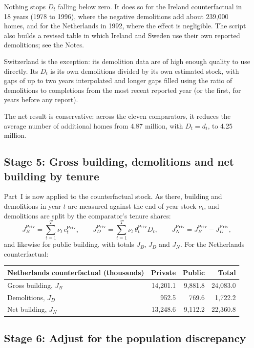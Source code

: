 \documentclass[11pt,a4paper]{article}
\newcommand{\priv}{\mathrm{Priv}}
\begin{document}
Nothing stops $D_t$ falling below zero. It does so for the Ireland counterfactual in 18
years (1978 to 1996), where the negative demolitions add about 239,000 homes, and for the
Netherlands in 1992, where the effect is negligible. The script also builds a revised table in
which Ireland and Sweden use their own reported demolitions; see the Notes.

Switzerland is the exception: its demolition data are of high enough quality to use
directly. Its $D_t$ is its own demolitions divided by its own estimated stock, with gaps of
up to two years interpolated and longer gaps filled using the ratio of demolitions to
completions from the most recent reported year (or the first, for years before any
report).

The net result is conservative: across the eleven comparators, it reduces the average
number of additional homes from 4.87 million, with $D_t = d_t$, to 4.25 million.

\subsection*{Stage 5: Gross building, demolitions and net building by tenure}

Part~I is now applied to the counterfactual stock. As there, building and demolitions in
year $t$ are measured against the end-of-year stock $\nu_t$, and demolitions are split by
the comparator's tenure shares:
\[
  J_B^{\priv} = \sum_{t=1}^{T} \nu_t\, c_t^{\priv}, \qquad
  J_D^{\priv} = \sum_{t=1}^{T} \nu_t\, \theta_t^{\priv} D_t, \qquad
  J_N^{\priv} = J_B^{\priv} - J_D^{\priv},
\]
and likewise for public building, with totals $J_B$, $J_D$ and $J_N$. For the
Netherlands counterfactual:

\begin{center}
\begin{tabular}{lrrr}
  \toprule
  Netherlands counterfactual (thousands) & Private & Public & Total\\
  \midrule
  Gross building, $J_B$  & 14,201.1 & 9,881.8 & 24,083.0\\
  Demolitions, $J_D$     &    952.5 &   769.6 &  1,722.2\\
  Net building, $J_N$    & 13,248.6 & 9,112.2 & 22,360.8\\
  \bottomrule
\end{tabular}
\end{center}

\subsection*{Stage 6: Adjust for the population discrepancy}
\end{document}
